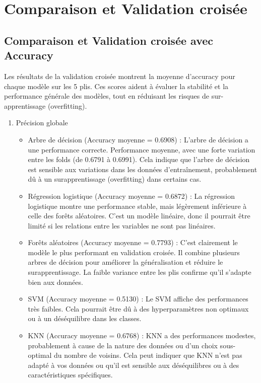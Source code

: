 \section{Comparaison et Validation croisée}
\subsection{Comparaison et Validation croisée avec Accuracy}
\begin{flushleft}
Les résultats de la validation croisée montrent la moyenne d'accuracy pour chaque modèle sur les 5 plis. Ces scores aident à évaluer la stabilité et la performance générale des modèles, tout en réduisant les risques de sur-apprentissage (overfitting).

\begin{enumerate}
\item Précision globale
\begin{itemize}
\item Arbre de décision (Accuracy moyenne = 0.6908) : L'arbre de décision a une performance correcte.
Performance moyenne, avec une forte variation entre les folds (de 0.6791 à 0.6991). Cela indique que l’arbre de décision est sensible aux variations dans les données d’entraînement, probablement dû à un surapprentissage (overfitting) dans certains cas.
\item Régression logistique (Accuracy moyenne = 0.6872) : La régression logistique montre une performance stable, mais légèrement inférieure à celle des forêts aléatoires.  C'est un modèle linéaire, donc il pourrait être limité si les relations entre les variables ne sont pas linéaires.
\item Forêts aléatoires (Accuracy moyenne = 0.7793) :
C'est clairement le modèle le plus performant en validation croisée. Il combine plusieurs arbres de décision pour améliorer la généralisation et réduire le surapprentissage. La faible variance entre les plis confirme qu'il s'adapte bien aux données.
\item SVM (Accuracy moyenne = 0.5130) : Le SVM affiche des performances très faibles.
Cela pourrait être dû à des hyperparamètres non optimaux ou à un déséquilibre dans les classes.
\item KNN (Accuracy moyenne = 0.6768) : KNN a des performances modestes, probablement à cause de la nature des données ou d'un choix sous-optimal du nombre de voisins. Cela peut indiquer que KNN n'est pas adapté à vos données ou qu'il est sensible aux déséquilibres ou à des caractéristiques spécifiques.
\end{itemize}


\end{enumerate}
\end{flushleft}
